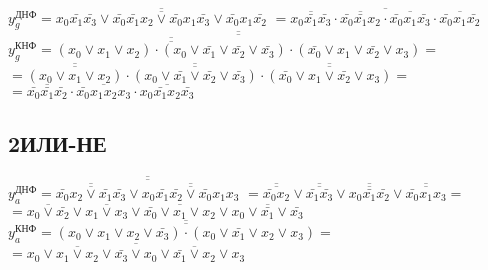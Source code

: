 \documentclass{bmstu}
\begin{document}
	$y^{\text{ДНФ}}_g = \overline{\overline{x_0 \bar{x_1} \bar{x_3} \vee \bar{x_0} \bar{x_1} x_2 \vee \bar{x_0} x_1 \bar{x_3} \vee \bar{x_0} x_1 \bar{x_2}}}$
	$= \overline{\overline{x_0 \bar{x_1} \bar{x_3}} \cdot \overline{\bar{x_0} \bar{x_1} x_2} \cdot \overline{\bar{x_0} x_1 \bar{x_3}} \cdot \overline{\bar{x_0} x_1 \bar{x_2}}}$ \\
	$y^{\text{КНФ}}_g = \overline{\overline{\overline{\overline{(x_0 \vee x_1 \vee x_2) \cdot (x_0 \vee \bar{x_1} \vee \bar{x_2} \vee \bar{x_3})}} \cdot (\bar{x_0} \vee x_1 \vee \bar{x_2} \vee x_3)}} =$ \\
	$= \overline{\overline{(x_0 \vee x_1 \vee x_2)}} \cdot \overline{\overline{(x_0 \vee \bar{x_1} \vee \bar{x_2} \vee \bar{x_3})}} \cdot \overline{\overline{(\bar{x_0} \vee x_1 \vee \bar{x_2} \vee x_3)}} =$ \\
	$= \overline{\bar{x_0} \bar{x_1} \bar{x_2}} \cdot \overline{\bar{x_0} x_1 x_2 x_3} \cdot \overline{x_0 \bar{x_1} x_2 \bar{x_3}}$ \\
	
	\subsection{2ИЛИ-НЕ}
	
	$y^{\text{ДНФ}}_a = \overline{\overline{\overline{\overline{ \bar{x_0} x_2 \vee \bar{x_1} \bar{x_3} }} \vee \overline{\overline{ x_0 \bar{x_1} \bar{x_2} \vee \bar{x_0} x_1 x_3}} }}$
	$= \overline{\overline{\bar{x_0} x_2}} \vee \overline{\overline{\bar{x_1} \bar{x_3}}} \vee \overline{\overline{x_0 \bar{x_1} \bar{x_2}}} \vee \overline{\overline{\bar{x_0} x_1 x_3}} =$ \\
	$= \overline{ x_0 \vee \bar{x_2}} \vee \overline{x_1 \vee x_3} \vee \overline{\bar{x_0} \vee x_1 \vee x_2} \vee \overline{x_0 \vee \bar{x_1} \vee \bar{x_3}}$ \\
	$y^{\text{КНФ}}_a = \overline{\overline{(x_0 \vee x_1 \vee x_2 \vee \bar{x_3}) \cdot (x_0 \vee \bar{x_1} \vee x_2 \vee x_3)}} =$\\
	$= \overline{\overline{x_0 \vee x_1 \vee x_2 \vee \bar{x_3}} \vee \overline{x_0 \vee \bar{x_1} \vee x_2 \vee x_3}}$ \\
	
\end{document}
